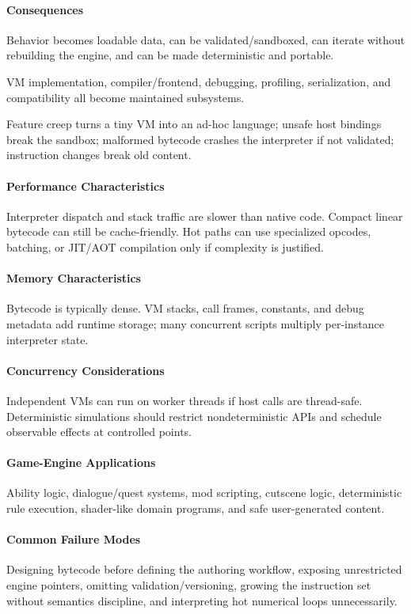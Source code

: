 \documentclass[11pt]{article}
\begin{document}
\paragraph{Consequences}
\begin{description}[leftmargin=2.7cm,style=nextline]
\item[Benefits] Behavior becomes loadable data, can be validated/sandboxed, can iterate without rebuilding the engine, and can be made deterministic and portable.
\item[Costs] VM implementation, compiler/frontend, debugging, profiling, serialization, and compatibility all become maintained subsystems.
\item[Risks] Feature creep turns a tiny VM into an ad-hoc language; unsafe host bindings break the sandbox; malformed bytecode crashes the interpreter if not validated; instruction changes break old content.
\end{description}
\paragraph{Performance Characteristics} Interpreter dispatch and stack traffic are slower than native code. Compact linear bytecode can still be cache-friendly. Hot paths can use specialized opcodes, batching, or JIT/AOT compilation only if complexity is justified.
\paragraph{Memory Characteristics} Bytecode is typically dense. VM stacks, call frames, constants, and debug metadata add runtime storage; many concurrent scripts multiply per-instance interpreter state.
\paragraph{Concurrency Considerations} Independent VMs can run on worker threads if host calls are thread-safe. Deterministic simulations should restrict nondeterministic APIs and schedule observable effects at controlled points.
\paragraph{Game-Engine Applications} Ability logic, dialogue/quest systems, mod scripting, cutscene logic, deterministic rule execution, shader-like domain programs, and safe user-generated content.
\paragraph{Common Failure Modes} Designing bytecode before defining the authoring workflow, exposing unrestricted engine pointers, omitting validation/versioning, growing the instruction set without semantics discipline, and interpreting hot numerical loops unnecessarily.
\end{document}
